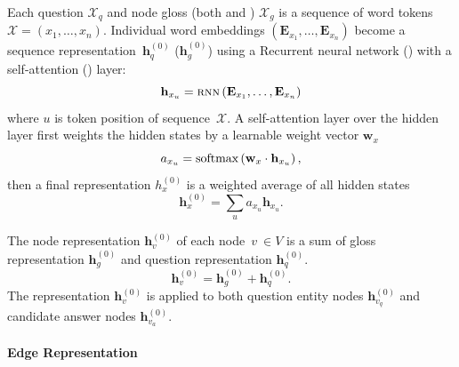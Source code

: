 Each question $\mathcal{X}_q$ and node gloss (both \rightnode{} and \leftnode{}) $\mathcal{X}_{g}$ 
is a sequence of word tokens $\mathcal{X} = (x_1,\dots, x_n)$.  Individual word embeddings $(\mathbf{E}_{x_1},\dots,
\mathbf{E}_{x_n})$ become a sequence representation~$\mathbf{h}_q^{(0)}$ ($\mathbf{h}_g^{(0)}$) using a 
Recurrent neural network () with a self-attention () layer:
\begin{equation}
\mathbf{h}_{x_u} = \mbox{\textsc{rnn}}\left(\mathbf{E}_{x_1},\dots, \mathbf{E}_{x_n}\right)
\end{equation}
where $u$ is token position of sequence~$\mathcal{X}$.  A
self-attention layer over the  hidden layer first weights the hidden states
by a learnable weight vector $\mathbf{w}_x$
\begin{equation}
  a_{x_u} = \mbox{softmax}\left(\mathbf{w}_x \cdot \mathbf{h}_{x_u}\right),
\label{eq:self_attn}
\end{equation}
then a final representation ${h}_x^{(0)}$ is a weighted average of 
all hidden states
\begin{equation}
\mathbf{h}_x^{(0)} = \sum_u a_{x_u}  \mathbf{h}_{x_u} .
\end{equation}

The node representation $\mathbf{h}_{v}^{(0)}$ of each node~$v~\in V$
is a sum of gloss representation $\mathbf{h}^{(0)}_{g}$ 
and question representation $\mathbf{h}_q^{(0)}$.
\begin{equation}
    \mathbf{h}_{v}^{(0)} = \mathbf{h}^{(0)}_{g} + \mathbf{h}_q^{(0)}.
\end{equation}
The representation $\mathbf{h}_{v}^{(0)}$ is applied to both question
entity nodes $\mathbf{h}_{v_q}^{(0)}$ and candidate answer nodes
$\mathbf{h}_{v_a}^{(0)}$.





\paragraph{Edge Representation}

